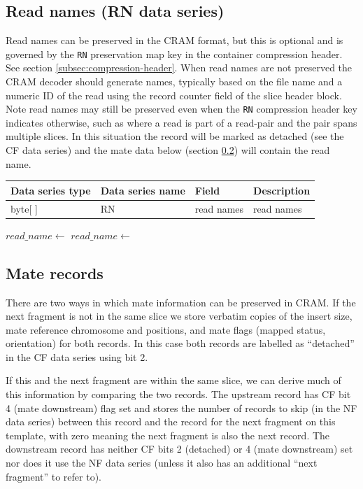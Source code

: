 \documentclass[a4paper]{article}
\begin{document}
\subsection{Read names (RN data series)}
\label{subsec:names}

Read names can be preserved in the CRAM format, but this is optional and is governed by the \texttt{RN} preservation map key in the container compression header. See section \ref{subsec:compression-header}.
When read names are not preserved the CRAM decoder should generate names, typically based on the file name and a numeric ID of the read using the record counter field of the slice header block.
Note read names may still be preserved even when the \texttt{RN} compression header key indicates otherwise, such as where a read is part of a read-pair and the pair spans multiple slices.
In this situation the record will be marked as detached (see the CF data series) and the mate data below (section \ref{subsec:mate}) will contain the read name.

\begin{tabular}{|>{\raggedright}p{70pt}|>{\raggedright}p{75pt}|>{\raggedright}p{90pt}|>{\raggedright}p{171pt}|}
\hline
\textbf{Data series type} & \textbf{Data series name} & \textbf{Field} & \textbf{Description}\tabularnewline
\hline
byte[ ] & RN & read names & read names\tabularnewline
\hline
\end{tabular}

\vskip 20pt
\begin{algorithmic}[1]
  \State $read\_name \gets$ 
\Else
  \State $read\_name \gets$ 
\EndIf
\Statex
\EndProcedure
\end{algorithmic}

\subsection{\textbf{Mate records}}
\label{subsec:mate}

There are two ways in which mate information can be preserved in CRAM.
If the next fragment is not in the same slice we store verbatim copies of the insert size, mate reference chromosome and positions, and mate flags (mapped status, orientation) for both records.
In this case both records are labelled as ``detached'' in the CF data series using bit 2.

If this and the next fragment are within the same slice, we can derive much of this information by comparing the two records.
The upstream record has CF bit 4 (mate downstream) flag set and stores the number of records to skip (in the NF data series) between this record and the record for the next fragment on this template, with zero meaning the next fragment is also the next record.
The downstream record has neither CF bits 2 (detached) or 4 (mate downstream) set nor does it use the NF data series (unless it also has an additional ``next fragment'' to refer to).
\end{document}
